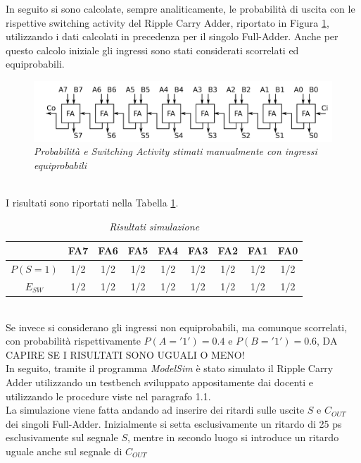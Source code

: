 \noindent In seguito si sono calcolate, sempre analiticamente, le probabilità di uscita con le rispettive switching activity del Ripple Carry Adder, riportato in Figura \ref{ripple}, utilizzando i dati calcolati in precedenza per il singolo Full-Adder. Anche per questo calcolo iniziale gli ingressi sono stati considerati scorrelati ed equiprobabili.
\begin{figure}[!htb]
	\centering
	\includegraphics[scale=0.9]{immagini/ripple}
	\caption{\textit{Probabilità e Switching Activity stimati manualmente con ingressi equiprobabili}}
	\label{ripple}
\end{figure} \\
I risultati sono riportati nella Tabella \ref{Tab1_3}.\\
\begin{table}[!h]\footnotesize
	\centering
	\begin{tabular}{|c|c|c|c|c|c|c|c|c|}
		\hline
		&\textbf{FA7}& \textbf{FA6}& \textbf{FA5} &\textbf{FA4}&\textbf{FA3}&\textbf{FA2}&\textbf{FA1}&\textbf{FA0}\\
		\hline
		$P(S=1)$&1/2 &1/2&1/2&1/2&1/2&1/2&1/2&1/2\\
		\hline
		$E_{SW}$&1/2&1/2&1/2&1/2&1/2&1/2&1/2&1/2\\
		\hline
	\end{tabular}
	\caption{\textit{Risultati simulazione}}
	\label{Tab1_3}
\end{table}
\\
\noindent Se invece si considerano gli ingressi non equiprobabili, ma comunque scorrelati, con probabilità rispettivamente $P(A='1')=0.4$ e $P(B='1')=0.6 $, DA CAPIRE SE I RISULTATI SONO UGUALI O MENO!\\
In seguito, tramite il programma \textit{ModelSim} è stato simulato il Ripple Carry Adder utilizzando un testbench sviluppato appositamente dai docenti e utilizzando le procedure viste nel paragrafo 1.1.\\
La simulazione viene fatta andando ad inserire dei ritardi sulle uscite $S$ e $C_{OUT}$ dei singoli Full-Adder. Inizialmente si setta esclusivamente un ritardo di 25 ps esclusivamente sul segnale $S$, mentre in secondo luogo si introduce un ritardo uguale anche sul segnale di $C_{OUT}$

